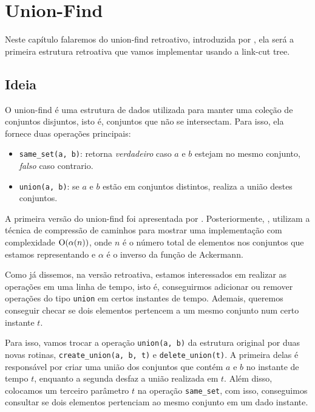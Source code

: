 
\chapter{Union-Find}
\label{cap:union-find}

Neste capítulo falaremos do union-find retroativo, introduzida por \citet{10.1145/1240233.1240236}, ela será a primeira estrutura retroativa que vamos implementar usando a link-cut tree.

\section{Ideia}
\label{sec:uf-ideia}

O union-find é uma estrutura de dados utilizada para manter uma coleção de conjuntos disjuntos, isto é, conjuntos que não se intersectam. Para isso, ela fornece duas operações principais:

\begin{itemize}
    \item \texttt{same\_set(a, b)}: retorna \emph{verdadeiro} caso $a$ e $b$ estejam no mesmo conjunto, \emph{falso} caso contrario.
    \item \texttt{union(a, b)}: se $a$ e $b$ estão em conjuntos distintos, realiza a união destes conjuntos.
\end{itemize}

A primeira versão do union-find foi apresentada por \citet{10.1145/364099.364331}. Posteriormente, \citet{10.1145/62.2160}, utilizam a técnica de compressão de caminhos para mostrar uma implementação com complexidade $\mathrm{O}( \alpha (n) )$, onde $n$ é o número total de elementos nos conjuntos que estamos representando e $\alpha$ é o inverso da função de Ackermann.

Como já dissemos, na versão retroativa, estamos interessados em realizar as operações em uma linha de tempo, isto é, conseguirmos adicionar ou remover operações do tipo \texttt{union} em certos instantes de tempo. Ademais, queremos conseguir checar se dois elementos pertencem a um mesmo conjunto num certo instante $t$.

Para isso, vamos trocar a operação \texttt{union(a, b)} da estrutura original por duas novas rotinas, \texttt{create\_union(a, b, t)} e \texttt{delete\_union(t)}. A primeira delas é responsável por criar uma união dos conjuntos que contém $a$ e $b$ no instante de tempo $t$, enquanto a segunda desfaz a união realizada em $t$. Além disso, colocamos um terceiro parâmetro $t$ na operação \texttt{same\_set}, com isso, conseguimos consultar se dois elementos pertenciam ao mesmo conjunto em um dado instante.

